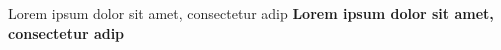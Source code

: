 \documentclass[multi={page}]{standalone}
\newenvironment{page}{}{}
\begin{document}
\begin{page}%
Lorem ipsum dolor sit amet, consectetur adip%
\end{page}
\begin{page}%
\bfseries
Lorem ipsum dolor sit amet, consectetur adip%
\end{page}
\begin{page}%
\makeatletter
\f@family
\makeatother
\end{page}
\end{document}
